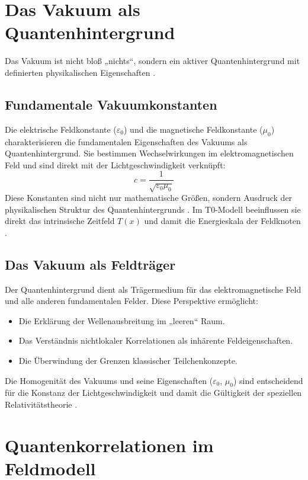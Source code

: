 \documentclass[a4paper,12pt]{article}
\newcommand{\Tfield}{T(x)}
\begin{document}
	\section{Das Vakuum als Quantenhintergrund}
	Das Vakuum ist nicht bloß „nichts“, sondern ein aktiver Quantenhintergrund mit definierten physikalischen Eigenschaften \cite{Milonni1994}.
	
	\subsection{Fundamentale Vakuumkonstanten}
	Die elektrische Feldkonstante (\(\varepsilon_0\)) und die magnetische Feldkonstante (\(\mu_0\)) charakterisieren die fundamentalen Eigenschaften des Vakuums als Quantenhintergrund. Sie bestimmen Wechselwirkungen im elektromagnetischen Feld und sind direkt mit der Lichtgeschwindigkeit verknüpft:
	\begin{equation}
		c = \frac{1}{\sqrt{\varepsilon_0 \mu_0}}
	\end{equation}
	Diese Konstanten sind nicht nur mathematische Größen, sondern Ausdruck der physikalischen Struktur des Quantenhintergrunds \cite{Aitchison2004}. Im T0-Modell beeinflussen sie direkt das intrinsische Zeitfeld \( \Tfield \) und damit die Energieskala der Feldknoten \cite{Pascher2024}.
	
	\subsection{Das Vakuum als Feldträger}
	Der Quantenhintergrund dient als Trägermedium für das elektromagnetische Feld und alle anderen fundamentalen Felder. Diese Perspektive ermöglicht:
	\begin{itemize}
		\item Die Erklärung der Wellenausbreitung im „leeren“ Raum.
		\item Das Verständnis nichtlokaler Korrelationen als inhärente Feldeigenschaften.
		\item Die Überwindung der Grenzen klassischer Teilchenkonzepte.
	\end{itemize}
	Die Homogenität des Vakuums und seine Eigenschaften (\(\varepsilon_0\), \(\mu_0\)) sind entscheidend für die Konstanz der Lichtgeschwindigkeit und damit die Gültigkeit der speziellen Relativitätstheorie \cite{Weinberg1995}.
	
	\section{Quantenkorrelationen im Feldmodell}
\end{document}
